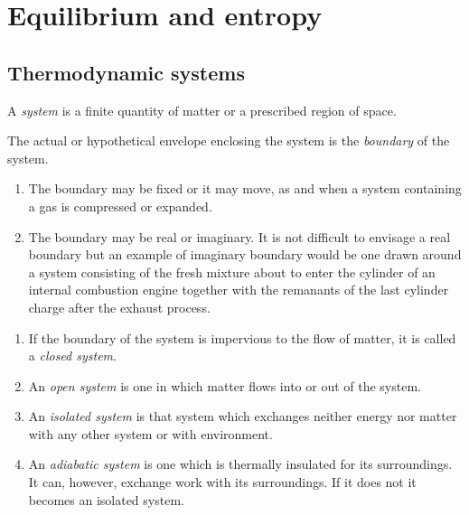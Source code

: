 \section{Equilibrium and entropy}


\subsection{Thermodynamic systems}

\begin{definition}[System]
	A \emph{system} is  a finite quantity of matter or a prescribed region of space.
\end{definition}

\begin{definition}[Boundary]
	The actual or hypothetical envelope enclosing the system is the \emph{boundary} of the system.
\end{definition}

\begin{remark}
	\begin{enumerate}
		\item The boundary may be fixed or it may move, as and when a system containing a gas is compressed or expanded.
		\item The boundary may be real or imaginary.
		It is not difficult to envisage a real boundary but an example of imaginary boundary would be one drawn around a system consisting of the fresh mixture about to enter the cylinder of an internal combustion engine together with the remanants of the last cylinder charge after the exhaust process.
	\end{enumerate}
\end{remark}

\begin{definition}
	\begin{enumerate}
		\item If the boundary of the system is impervious to the flow of matter, it is called a \emph{closed system}.
		\item An \emph{open system} is one in which matter flows into or out of the system.
		\item An \emph{isolated system} is that system which exchanges neither energy nor matter with any other system or with environment.
		\item An \emph{adiabatic system} is one which is thermally insulated for its surroundings.
		It can, however, exchange work with its surroundings.
		If it does not it becomes an isolated system.
	\end{enumerate}
\end{definition}

